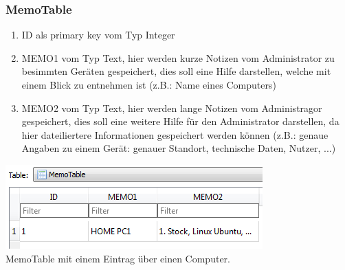 \documentclass[12pt,a4paper]{report}
\begin{document}
\begin{onehalfspace}
\subsubsection{MemoTable}
\begin{enumerate}
\item ID als primary key vom Typ Integer
\item MEMO1 vom Typ Text, hier werden kurze Notizen vom Administrator zu besimmten Geräten gespeichert, dies soll eine Hilfe darstellen, welche mit einem Blick zu entnehmen ist (z.B.: Name eines Computers)
\item MEMO2 vom Typ Text, hier werden lange Notizen vom Administragor gespeichert, dies soll eine weitere Hilfe für den Administrator darstellen, da hier dateiliertere Informationen gespeichert werden können (z.B.: genaue Angaben zu einem Gerät: genauer Standort, technische Daten, Nutzer, ...)
\end{enumerate}
\begin{center}
\includegraphics[scale=0.8]{img/db-tb-memo.png}\\
MemoTable mit einem Eintrag über einen Computer.
\end{center}

\end{onehalfspace}
\end{document}
